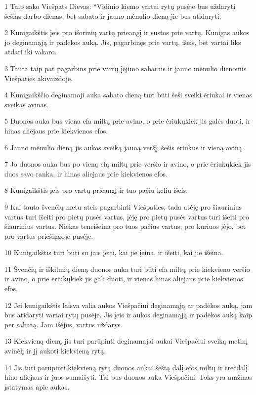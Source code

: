 \par 1 Taip sako Viešpats Dievas: “Vidinio kiemo vartai rytų pusėje bus uždaryti šešias darbo dienas, bet sabato ir jauno mėnulio dieną jie bus atidaryti. 
\par 2 Kunigaikštis įeis pro išorinių vartų prieangį ir sustos prie vartų. Kunigas aukos jo deginamąją ir padėkos auką. Jis, pagarbinęs prie vartų, išeis, bet vartai liks atdari iki vakaro. 
\par 3 Tauta taip pat pagarbins prie vartų įėjimo sabatais ir jauno mėnulio dienomis Viešpaties akivaizdoje. 
\par 4 Kunigaikščio deginamoji auka sabato dieną turi būti šeši sveiki ėriukai ir vienas sveikas avinas. 
\par 5 Duonos auka bus viena efa miltų prie avino, o prie ėriukų­kiek jis galės duoti, ir hinas aliejaus prie kiekvienos efos. 
\par 6 Jauno mėnulio dieną jis aukos sveiką jauną veršį, šešis ėriukus ir vieną aviną. 
\par 7 Jo duonos auka bus po vieną efą miltų prie veršio ir avino, o prie ėriukų­kiek jis duos savo ranka, ir hinas aliejaus prie kiekvienos efos. 
\par 8 Kunigaikštis įeis pro vartų prieangį ir tuo pačiu keliu išeis. 
\par 9 Kai tauta švenčių metu ateis pagarbinti Viešpaties, tada atėję pro šiaurinius vartus turi išeiti pro pietų pusės vartus, įėję pro pietų pusės vartus turi išeiti pro šiaurinius vartus. Niekas teneišeina pro tuos pačius vartus, pro kuriuos įėjo, bet pro vartus priešingoje pusėje. 
\par 10 Kunigaikštis turi būti su jais­ įeiti, kai jie įeina, ir išeiti, kai jie išeina. 
\par 11 Švenčių ir iškilmių dieną duonos auka turi būti efa miltų prie kiekvieno veršio ir avino, o prie ėriukų­kiek jis gali duoti, ir vienas hinas aliejaus prie kiekvienos efos. 
\par 12 Jei kunigaikštis laisva valia aukos Viešpačiui deginamąją ar padėkos auką, jam bus atidaryti vartai rytų pusėje. Jis įeis ir aukos deginamąją ir padėkos auką kaip per sabatą. Jam išėjus, vartus uždarys. 
\par 13 Kiekvieną dieną jis turi parūpinti deginamajai aukai Viešpačiui sveiką metinį avinėlį ir jį aukoti kiekvieną rytą. 
\par 14 Jis turi parūpinti kiekvieną rytą duonos aukai šeštą dalį efos miltų ir trečdalį hino aliejaus ir juos sumaišyti. Tai bus duonos auka Viešpačiui. Toks yra amžinas įstatymas apie aukas. 
